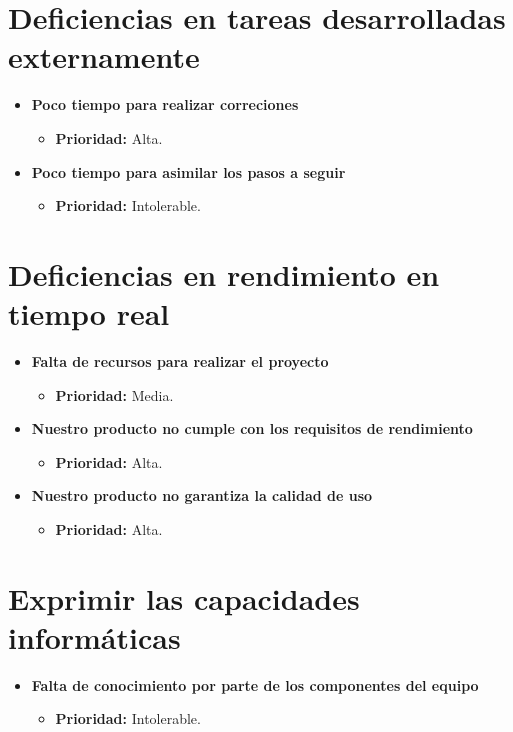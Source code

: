 \documentclass[spanish,a4paper,12pt]{report}	%
\begin{document}
\section{Deficiencias en tareas desarrolladas externamente}
	\begin{itemize}
		\item \textbf{Poco tiempo para realizar correciones}	%
			\begin{itemize}
				\item \textbf{Prioridad: }Alta.
			\end{itemize}
		
		\item \textbf{Poco tiempo para asimilar los pasos a seguir}	
			\begin{itemize}
				\item \textbf{Prioridad: }Intolerable.
			\end{itemize}
	\end{itemize}
%
\section{Deficiencias en rendimiento en tiempo real}
	\begin{itemize}
		\item \textbf{Falta de recursos para realizar el proyecto}	
			\begin{itemize}
				\item \textbf{Prioridad: }Media.
			\end{itemize}
		
		\item \textbf{Nuestro producto no cumple con los requisitos de rendimiento}	%
			\begin{itemize}
				\item \textbf{Prioridad: }Alta.
			\end{itemize}
		
		\item \textbf{Nuestro producto no garantiza la calidad de uso}%
			\begin{itemize}
				\item \textbf{Prioridad: }Alta.
			\end{itemize}
	\end{itemize}
%
\section{Exprimir las capacidades informáticas}
	\begin{itemize}
		\item \textbf{Falta de conocimiento por parte de los componentes del equipo}	
			\begin{itemize}
				\item \textbf{Prioridad: }Intolerable.
			\end{itemize}
	\end{itemize}
	
\end{document}
